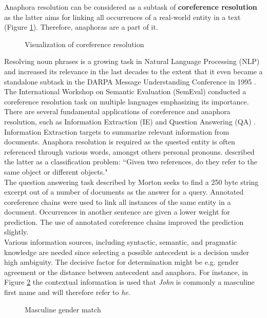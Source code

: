 Anaphora resolution can be considered as a subtask of \textbf{coreference resolution} as the latter aims for linking all occurrences of a real-world entity in a text (Figure \ref{figure:visofcoref}). Therefore, anaphoras are a part of it. 

\begin{figure}[h]
	\centering\sffamily
		\caption{Visualization of coreference resolution}
	\label{figure:visofcoref}
\end{figure}

Resolving noun phrases is a growing task in Natural Language Processing (NLP) and increased its relevance in the last decades to the extent that it even became a standalone subtask in the DARPA Message Understanding Conference in 1995 \citep{chinchor1995message}. The International Workshop on Semantic Evaluation (SemEval) conducted a coreference resolution task on multiple languages \citep{recasens2010semeval} emphasizing its importance. 
There are several fundamental applications of coreference and anaphora resolution, such as Information Extraction (IE) \citep{mccarthy1995using} and Question Answering (QA) \citep{morton2000coreference}.\\ 
Information Extraction targets to summarize relevant information from documents. Anaphora resolution is required as the quested entity is often referenced through various words, amongst others personal pronouns. \cite{mccarthy1995using} described the latter as a classification problem: ``Given two references, do they refer to the same object or different objects."\\
The question answering task described by Morton seeks to find a 250 byte string excerpt out of a number of documents as the answer for a query. Annotated coreference chains were used to link all instances of the same entity in a document. Occurrences in another sentence are given a lower weight for prediction. The use of annotated coreference chains improved the prediction slightly.\\
Various information sources, including syntactic, semantic, and pragmatic knowledge are needed since selecting a possible antecedent is a decision under high ambiguity. The decisive factor for determination might be e.g. gender agreement or the distance between antecedent and anaphora. For instance, in Figure \ref{figure:mascmatch} the contextual information is used that \textit{John} is commonly a masculine first name and will therefore refer to \textit{he}.
\begin{figure}[h]
\centering\sffamily
\caption{Masculine gender match}
	\label{figure:mascmatch}
\end{figure}

